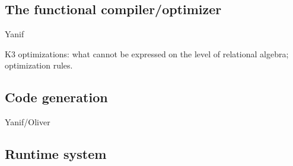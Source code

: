 
\subsection{The functional compiler/optimizer}
\label{sec:kthree}

Yanif

K3 optimizations: what cannot be expressed on the level of relational algebra; optimization rules. 

\subsection{Code generation}
\label{sec:codegen}


Yanif/Oliver

\subsection{Runtime system}
\label{sec:runtime}






